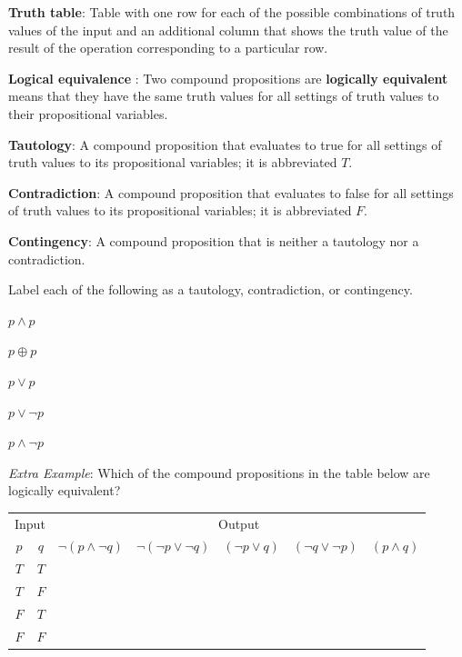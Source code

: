 \documentclass[12pt, oneside]{article}
\begin{document}
{\bf Truth table}: Table with one row for each of the possible combinations of truth values of the input and 
    an additional column that shows the truth value of the result of the operation corresponding to a particular row.
    
 

{\bf Logical equivalence }: Two compound  propositions are {\bf logically  equivalent} means that  they 
have the  same  truth  values for all settings of truth  values to their propositional  variables.

{\bf Tautology}:  A compound proposition that evaluates to true
for all settings of truth  values to its propositional  variables; it is  abbreviated $T$.

{\bf Contradiction}: A compound proposition that  evaluates  to  false 
for  all settings of truth  values to its propositional  variables; it  is abbreviated $F$.

{\bf Contingency}: A compound proposition that is neither a tautology nor a contradiction.
 \vfill


Label each of the following as a tautology, contradiction, or contingency.

$p \land p$

\vfill

$p \oplus p$

\vfill

$p \lor p$

\vfill

$p \lor \lnot p$

\vfill

$p \land \lnot p$

\vfill

 \vfill


{\it Extra Example}: Which of the  compound propositions in the table below are logically equivalent?
\begin{center}
\begin{tabular}{cc||c|c|c|c|c}
\multicolumn{2}{c||}{Input}  & \multicolumn{5}{c}{Output} \\
$p$ & $q$ & $\lnot (p \land \lnot q)$ & $\lnot (\lnot p  \lor \lnot q)$ &  $(\lnot p \lor  q)$
& $(\lnot q \lor \lnot p)$ & $(p \land q)$  \\
\hline
$T$ & $T$ & &&&&\\
$T$ & $F$ & &&&&\\
$F$ & $T$ & &&&&\\
$F$ & $F$ & &&&&\\
\end{tabular}
\end{center} \vfill
\end{document}
